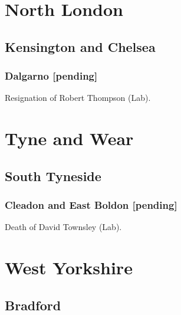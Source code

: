 \documentclass[a4paper,openany]{book}
\begin{document}
\begin{resultsiii}

\section{North London}

\subsection*{Kensington and Chelsea}

\subsubsection*{Dalgarno
\hspace*{\fill}\nolinebreak[1]%
\enspace\hspace*{\fill}
[pending]}


Resignation of Robert Thompson (Lab).

\section{Tyne and Wear}

\subsection*{South Tyneside}

\subsubsection*{Cleadon and East Boldon \hspace*{\fill}\nolinebreak[1]%
	\enspace\hspace*{\fill}
	[pending]}


Death of David Townsley (Lab).

\section{West Yorkshire}

\subsection*{Bradford}


\end{resultsiii}
\end{document}

